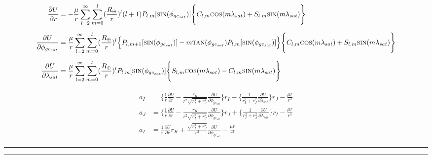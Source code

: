 \begin{gather}
    \begin{split}
        \frac{\partial U}{\partial r} &= -\frac{\mu}{r}\sum_{l=2}^{\infty}\sum_{m=0}^{l}(\frac{R_{\oplus}}{r})^l(l+1)P_{l,m}[\text{\footnotesize{SIN}}(\phi_{gc_{sat}})]\Biggl\{C_{l,m}\text{\footnotesize{COS}}(m\lambda_{sat})+S_{l,m}\text{\footnotesize{SIN}}(m\lambda_{sat})\Biggr\}\\[0.2cm]
        \frac{\partial U}{\partial\phi_{gc_{sat}}} &= \frac{\mu}{r}\sum_{l=2}^{\infty}\sum_{m=0}^{l}(\frac{R_\oplus}{r})^l\Big\{P_{l,m+1}[\text{\footnotesize{SIN}}(\phi_{gc_{sat}})]-m\text{\footnotesize{TAN}}(\phi_{gc_{sat}})P_{l,m}[\text{\footnotesize{SIN}}(\phi_{gc_{sat}})]\Big\}\Biggl\{C_{l,m}\text{\footnotesize{COS}}(m\lambda_{sat})+S_{l,m}\text{\footnotesize{SIN}}(m\lambda_{sat})\Biggr\}\\[0.2cm]
        \frac{\partial U}{\partial\lambda_{sat}} &= \frac{\mu}{r}\sum_{l=2}^{\infty}\sum_{m=0}^{l}(\frac{R_\oplus}{r})^lP_{l,m}[\text{\footnotesize{SIN}}(\phi_{gc_{sat}})]\Bigg\{S_{l,m}\text{\footnotesize{COS}}(m\lambda_{sat})-C_{l,m}\text{\footnotesize{SIN}}(m\lambda_{sat})\Bigg\}
    \end{split}
\end{gather}
\center{\Big\Downarrow}

\begin{gather}
    \begin{split}
        a_I &= \Bigg\{\frac{1}{r}\frac{\partial U}{\partial r}-\frac{r_K}{r^2\sqrt{r_I^2+r_J^2}}\frac{\partial U}{\partial\phi_{gc_{sat}}}\Bigg\}r_I - \Bigg\{\frac{1}{r_I^2+r_J^2}\frac{\partial U}{\partial\lambda_{sat}}\Bigg\}r_J - \frac{\mu r}{r^3}\\[0.2cm]
        a_J &= \Bigg\{\frac{1}{r}\frac{\partial U}{\partial r}-\frac{r_K}{r^2\sqrt{r_I^2+r_J^2}}\frac{\partial U}{\partial\phi_{gc_{sat}}}\Bigg\}r_J + \Bigg\{\frac{1}{r_I^2+r_J^2}\frac{\partial U}{\partial\lambda_{sat}}\Bigg\}r_I - \frac{\mu r}{r^3}\\[0.2cm]
        a_I &= \frac{1}{r}\frac{\partial U}{\partial r}r_K  + \frac{\sqrt{r_I^2+r_J^2}}{r^2}\frac{\partial U}{\partial\phi_{gc_{sat}}}- \frac{\mu r}{r^3}
    \end{split}
\end{gather}
\vspace{0.2cm}
\hrule
\vspace{0.1cm}
\hrule